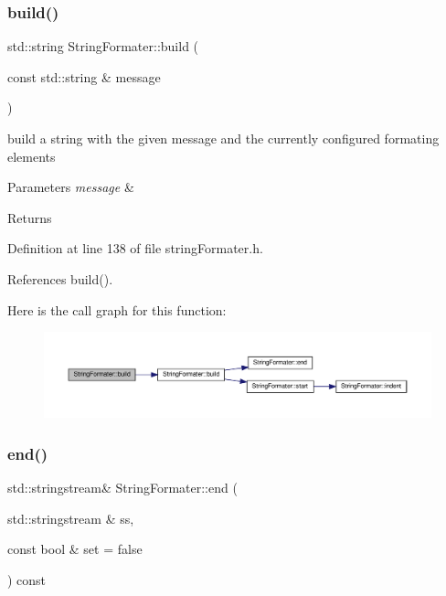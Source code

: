 \subsubsection{\texorpdfstring{build()}{build()}\hspace{0.1cm}{\footnotesize\ttfamily [2/2]}}
{\footnotesize\ttfamily std\+::string String\+Formater\+::build (\begin{DoxyParamCaption}\item[{const std\+::string \&}]{message }\end{DoxyParamCaption})\hspace{0.3cm}{\ttfamily [inline]}}

build a string with the given message and the currently configured formating elements 
\begin{DoxyParams}{Parameters}
{\em message} & \\
\hline
\end{DoxyParams}
\begin{DoxyReturn}{Returns}

\end{DoxyReturn}


Definition at line 138 of file string\+Formater.\+h.



References build().

Here is the call graph for this function\+:
\nopagebreak
\begin{figure}[H]
\begin{center}
\leavevmode
\includegraphics[width=350pt]{classStringFormater_a1772b0244f215c077dfd34248c9f0428_cgraph}
\end{center}
\end{figure}
\mbox{\label{classStringFormater_a63052da61a599fc14687f26b9d2f005b}} 
\subsubsection{\texorpdfstring{end()}{end()}\hspace{0.1cm}{\footnotesize\ttfamily [1/2]}}
{\footnotesize\ttfamily std\+::stringstream\& String\+Formater\+::end (\begin{DoxyParamCaption}\item[{std\+::stringstream \&}]{ss,  }\item[{const bool \&}]{set = {\ttfamily false} }\end{DoxyParamCaption}) const\hspace{0.3cm}{\ttfamily [inline]}}



